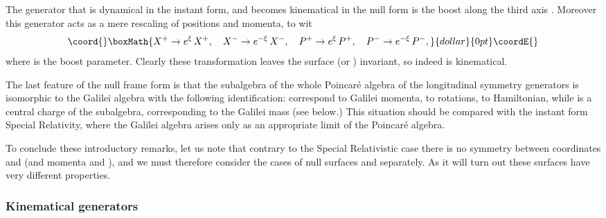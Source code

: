 \documentclass [12pt]  {article}
\begin{document}
The generator that is dynamical in the instant form, and becomes
kinematical in the null form is the boost along the third axis
\coordHE{}. Moreover this generator acts as a mere rescaling of
positions and momenta, to wit
$$\coord{}\boxMath{
X^+ \rightarrow e^\xi\,X^+, \quad X^- \rightarrow e^{-\xi}\,X^-,
\quad P^+ \rightarrow e^\xi\,P^+, \quad P^- \rightarrow
e^{-\xi}\,P^-,
}{dollar}{0pt}\coordE{}$$
where \myHighlight{$\xi$}\coordHE{} is the boost parameter. Clearly these transformation
leaves the surface \coordHE{} (or \coordHE{}) invariant, so indeed
\coordHE{} is kinematical.

The last feature of the null frame form is that the subalgebra of
the whole Poincar\'e algebra of the longitudinal symmetry
generators is isomorphic to the Galilei \cite{SBH} algebra with
the following identification: \coordHE{} correspond to Galilei momenta,
\coordHE{} to rotations, \coordHE{} to Hamiltonian, while \coordHE{} is a
central charge of the subalgebra, corresponding to the Galilei
mass (see below.) This situation should be compared with the
instant form Special Relativity, where the Galilei algebra arises
only as an appropriate limit of the Poincar\'e algebra.


To conclude these introductory remarks, let us note that contrary
to the Special Relativistic case there is no \myHighlight{$+ \leftrightarrow -$}\coordHE{}
symmetry between coordinates \coordHE{} and \coordHE{} (and momenta \coordHE{}
and \coordHE{}), and we must therefore consider the cases of null
surfaces \coordHE{} and \coordHE{} separately. As it will turn out these
surfaces have very different properties.

\subsubsection*{Kinematical generators}
\end{document}
